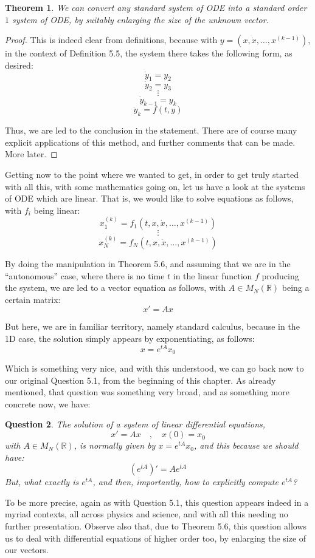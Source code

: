 \documentclass[12pt]{amsbook}
\newtheorem{theorem}{Theorem}[chapter]
\newtheorem{question}[theorem]{Question}
\begin{document}
\begin{theorem}
We can convert any standard system of ODE into a standard order $1$ system of ODE, by suitably enlarging the size of the unknown vector.
\end{theorem}

\begin{proof}
This is indeed clear from definitions, because with $y=(x,\dot{x},\ldots,x^{(k-1)})$, in the context of Definition 5.5, the system there takes the following form, as desired:
$$\dot{y}_1=y_2$$
$$\dot{y}_2=y_3$$
$$\vdots$$
$$\dot{y}_{k-1}=y_k$$
$$\dot{y}_k=f(t,y)$$

Thus, we are led to the conclusion in the statement. There are of course many explicit applications of this method, and further comments that can be made. More later.
\end{proof}

Getting now to the point where we wanted to get, in order to get truly started with all this, with some mathematics going on, let us have a look at the systems of ODE which are linear. That is, we would like to solve equations as follows, with $f_i$ being linear:
$$x_1^{(k)}=f_1(t,x,\dot{x},\ldots,x^{(k-1)})$$
$$\vdots$$
$$x_N^{(k)}=f_N(t,x,\dot{x},\ldots,x^{(k-1)})$$

By doing the manipulation in Theorem 5.6, and assuming that we are in the ``autonomous'' case, where there is no time $t$ in the linear function $f$ producing the system, we are led to a vector equation as follows, with $A\in M_N(\mathbb R)$ being a certain matrix:
$$x'=Ax$$

But here, we are in familiar territory, namely standard calculus, because in the 1D case, the solution simply appears by exponentiating, as follows: 
$$x=e^{tA}x_0$$

Which is something very nice, and with this understood, we can go back now to our original Question 5.1, from the beginning of this chapter. As already mentioned, that question was something very broad, and as something more concrete now, we have:

\begin{question}
The solution of a system of linear differential equations,
$$x'=Ax\quad,\quad x(0)=x_0$$
with $A\in M_N(\mathbb R)$, is normally given by $x=e^{tA}x_0$, and this because we should have:
$$(e^{tA})'=Ae^{tA}$$
But, what exactly is $e^{tA}$, and then, importantly, how to explicitly compute $e^{tA}$? 
\end{question}

To be more precise, again as with Question 5.1, this question appears indeed in a myriad contexts, all across physics and science, and with all this needing no further presentation. Observe also that, due to Theorem 5.6, this question allows us to deal with differential equations of higher order too, by enlarging the size of our vectors.
\end{document}

